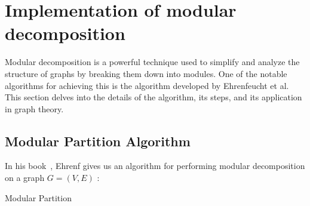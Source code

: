 
\chapter{Implementation of modular decomposition}\label{ch:implementation-of-modular-decomposition}

Modular decomposition is a powerful technique used to simplify and analyze the structure of graphs by breaking them down into modules.
One of the notable algorithms for achieving this is the algorithm developed by Ehrenfeucht et al.
This section delves into the details of the algorithm, its steps, and its application in graph theory.

\section{Modular Partition Algorithm}\label{sec:modular-partition-algorithm}

In his book~\cite{SAMD}, Ehrenf gives us an algorithm for performing modular decomposition on a graph $G = (V, E)$ :

\begin{algorithm}[H]
    \caption{Modular Partition}
\end{algorithm}\label{alg:modular-partition-algorithm}

